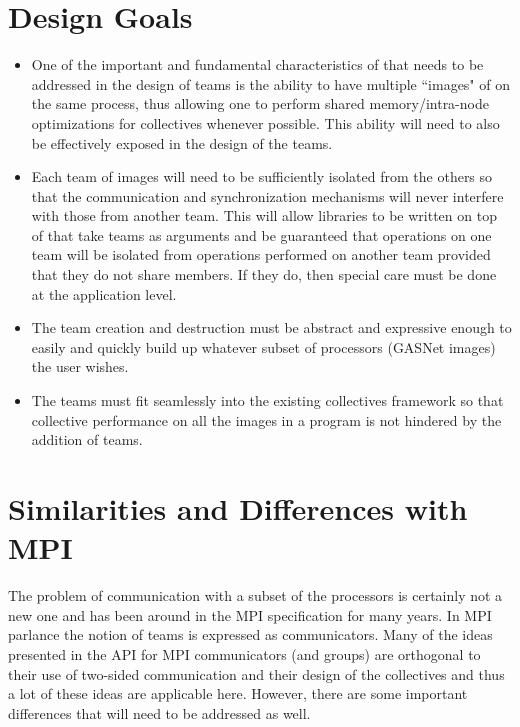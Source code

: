 \documentclass[times,10pt]{article}
\begin{document}
\section{Design Goals}
\begin{itemize}
\item One of the important and fundamental characteristics of \gasnet that
needs to be addressed in the design of teams is the ability to have multiple
``images" of \gasnet on the same \gasnet process, thus allowing one to perform
shared memory/intra-node optimizations for collectives whenever possible. This
ability will need to also be effectively exposed in the design of the teams. 

\item Each team of images will need to be sufficiently isolated from the others
so that the communication and synchronization mechanisms will never interfere
with those from another team. This will allow libraries to be written on top of
\gasnet that take teams as arguments and be guaranteed that operations on one
team will be isolated from operations performed on another team provided that
they do not share members. If they do, then special care must be done at the
application level.

\item The team creation and destruction must be abstract and expressive enough
to easily and quickly build up whatever subset of processors (GASNet images) the user wishes.

\item The teams must fit seamlessly into the existing \gasnet collectives
framework so that collective performance on all the images in a \gasnet program
is not hindered by the addition of teams. 

\end{itemize}

\section{Similarities and Differences with MPI}
The problem of communication with a subset of the processors is certainly not a
new one and has been around in the MPI specification for many years. In MPI
parlance the notion of teams is expressed as communicators. Many of the ideas
presented in the API for MPI communicators (and groups) are orthogonal to their
use of two-sided communication and their design of the collectives and thus a
lot of these ideas are applicable here. However, there are some important
differences that will need to be addressed as well. 
\end{document}
